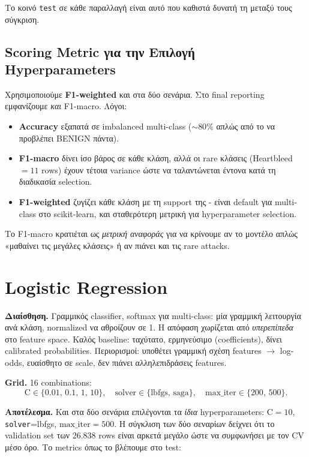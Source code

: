 \documentclass[12pt,a4paper,twoside]{book}
\begin{document}
Το κοινό \texttt{test} σε κάθε παραλλαγή είναι αυτό που καθιστά
δυνατή τη μεταξύ τους σύγκριση.

\subsection{Scoring Metric για την Επιλογή Hyperparameters}

Χρησιμοποιούμε \textbf{F1-weighted} και στα δύο σενάρια. Στο final
reporting εμφανίζουμε \emph{και} F1-macro. Λόγοι:
\begin{itemize}
    \item \textbf{Accuracy} εξαπατά σε imbalanced multi-class (\(\sim
    80\%\) απλώς από το να προβλέπει BENIGN πάντα).
    \item \textbf{F1-macro} δίνει ίσο βάρος σε κάθε κλάση, αλλά οι
    rare κλάσεις (Heartbleed \(=11\) rows) έχουν τέτοια variance ώστε
    να ταλαντώνεται έντονα κατά τη διαδικασία selection.
    \item \textbf{F1-weighted} ζυγίζει κάθε κλάση με τη support της -
    είναι default για multi-class στο scikit-learn, και σταθερότερη
    μετρική για hyperparameter selection.
\end{itemize}
Το F1-macro κρατιέται ως \emph{μετρική αναφοράς} για να κρίνουμε αν το
μοντέλο απλώς «μαθαίνει τις μεγάλες κλάσεις» ή αν πιάνει και τις rare
attacks.

\section{Logistic Regression}\label{sec:q2_lr}

\textbf{Διαίσθηση.} Γραμμικός classifier, softmax για multi-class:
μία γραμμική λειτουργία ανά κλάση, normalized να αθροίζουν σε 1. Η
απόφαση χωρίζεται από \emph{υπερεπίπεδα} στο feature space. Καλός
baseline: ταχύτατο, ερμηνεύσιμο (coefficients), δίνει calibrated
probabilities. Περιορισμοί: υποθέτει γραμμική σχέση features
\(\to\) log-odds, ευαίσθητο σε scale, δεν πιάνει αλληλεπιδράσεις
features.

\textbf{Grid.} 16 combinations:
\[
\text{C} \in \{0.01,\,0.1,\,1,\,10\},\quad
\text{solver} \in \{\text{lbfgs},\,\text{saga}\},\quad
\text{max\_iter} \in \{200,\,500\}.
\]

\textbf{Αποτέλεσμα.} Και στα δύο σενάρια επιλέγονται τα \emph{ίδια}
hyperparameters: \(\text{C}=10\), \texttt{solver}=lbfgs,
\(\text{max\_iter}=500\). Η σύγκλιση των δύο σεναρίων δείχνει ότι το
validation set των 26.838 rows είναι αρκετά μεγάλο ώστε να συμφωνήσει
με τον CV μέσο όρο. Το metrics όπως το βλέπουμε στο test:
\end{document}
